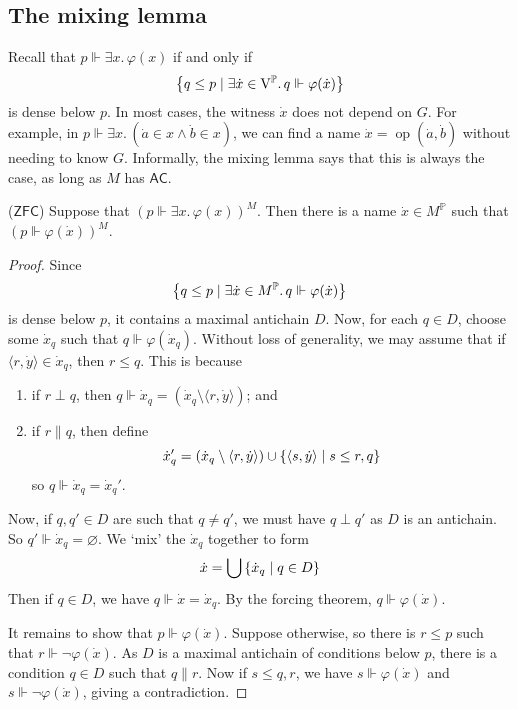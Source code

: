\subsection{The mixing lemma}
Recall that \( p \Vdash \exists x.\, \varphi(x) \) if and only if
\[ \qty{q \leq p \mid \exists \dot x \in \mathrm{V}^{\mathbb P}.\, q \Vdash \varphi(\dot x)} \]
is dense below \( p \).
In most cases, the witness \( \dot x \) does not depend on \( G \).
For example, in \( p \Vdash \exists x.\, (\dot a \in x \wedge \dot b \in x) \), we can find a name \( \dot x = \operatorname{op}(\dot a, \dot b) \) without needing to know \( G \).
Informally, the mixing lemma says that this is always the case, as long as \( M \) has \( \mathsf{AC} \).
\begin{theorem}
    (\( \mathsf{ZFC} \))
    Suppose that \( (p \Vdash \exists x.\, \varphi(x))^M \).
    Then there is a name \( \dot x \in M^{\mathbb P} \) such that \( (p \Vdash \varphi(\dot x))^M \).
\end{theorem}
\begin{proof}
    Since
    \[ \qty{q \leq p \mid \exists \dot x \in M^{\mathbb P}.\, q \Vdash \varphi(\dot x)} \]
    is dense below \( p \), it contains a maximal antichain \( D \).
    Now, for each \( q \in D \), choose some \( \dot x_q \) such that \( q \Vdash \varphi(\dot x_q) \).
    Without loss of generality, we may assume that if \( \langle r, \dot y \rangle \in \dot x_q \), then \( r \leq q \).
    This is because
    \begin{enumerate}
        \item if \( r \perp q \), then \( q \Vdash \dot x_q = (\dot x_q \setminus \langle r, \dot y \rangle) \); and
        \item if \( r \mathrel\| q \), then define
        \[ \dot x_q' = (\dot x_q \setminus \langle r, \dot y \rangle) \cup \qty{\langle s, \dot y \rangle \mid s \leq r, q} \]
        so \( q \Vdash \dot x_q = \dot x_q' \).
    \end{enumerate}
    Now, if \( q, q' \in D \) are such that \( q \neq q' \), we must have \( q \perp q' \) as \( D \) is an antichain.
    So \( q' \Vdash \dot x_q = \varnothing \).
    We `mix' the \( \dot x_q \) together to form
    \[ \dot x = \bigcup \qty{\dot x_q \mid q \in D} \]
    Then if \( q \in D \), we have \( q \Vdash \dot x = \dot x_q \).
    By the forcing theorem, \( q \Vdash \varphi(\dot x) \).

    It remains to show that \( p \Vdash \varphi(\dot x) \).
    Suppose otherwise, so there is \( r \leq p \) such that \( r \Vdash \neg\varphi(\dot x) \).
    As \( D \) is a maximal antichain of conditions below \( p \), there is a condition \( q \in D \) such that \( q \mathrel\| r \).
    Now if \( s \leq q, r \), we have \( s \Vdash \varphi(\dot x) \) and \( s \Vdash \neg\varphi(\dot x) \), giving a contradiction.
\end{proof}

